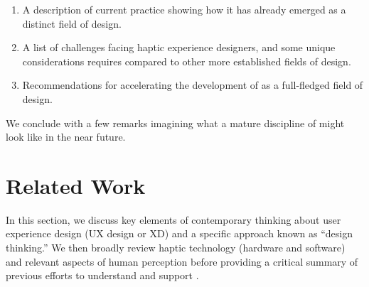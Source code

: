 \begin{enumerate}

    \item A description of current \haxd practice showing how it has already emerged as a distinct field of design.
    \item A list of challenges facing haptic experience designers, and some unique considerations \haxd requires compared to other more established fields of design.
    \item Recommendations for accelerating the development of \haxd as a full-fledged field of design.
\end{enumerate}

\noindent
We conclude with a few remarks imagining what a mature discipline of \haxd might look like in the near future.



%
%
\section{Related Work}
\label{sec:lit-review}
\noindent
In this section, we discuss key elements of contemporary thinking about user experience design (UX design or XD) and a specific approach known as ``design thinking.'' We then broadly review haptic technology (hardware and software) and relevant aspects of human perception before providing a critical summary of previous efforts to understand and support \haxd. 

